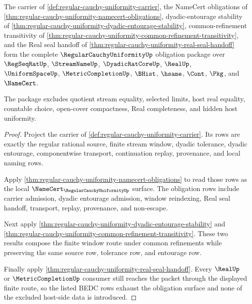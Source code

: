 \begin{theorem}
\label{thm:regular-cauchy-uniformity-scoped-obligation-package}
The carrier of \autoref{def:regular-cauchy-uniformity-carrier}, the NameCert obligations of \autoref{thm:regular-cauchy-uniformity-namecert-obligations}, dyadic-entourage stability of \autoref{thm:regular-cauchy-uniformity-dyadic-entourage-stability}, common-refinement transitivity of \autoref{thm:regular-cauchy-uniformity-common-refinement-transitivity}, and the Real seal handoff of \autoref{thm:regular-cauchy-uniformity-real-seal-handoff} form the complete $\RegularCauchyUniformityUp$ obligation package over $\RegSeqRatUp$, $\StreamNameUp$, $\DyadicRatCoreUp$, $\RealUp$, $\UniformSpaceUp$, $\MetricCompletionUp$, $\BHist$, $\hsame$, $\Cont$, $\Pkg$, and $\NameCert$.

The package excludes quotient stream equality, selected limits, host real equality, countable choice, open-cover compactness, Real completeness, and hidden host uniformity.
\end{theorem}
\begin{proof}
Project the carrier of \autoref{def:regular-cauchy-uniformity-carrier}. Its rows are exactly the regular rational source, finite stream window, dyadic tolerance, dyadic entourage, componentwise transport, continuation replay, provenance, and local naming rows.

Apply \autoref{thm:regular-cauchy-uniformity-namecert-obligations} to read those rows as the local $\NameCert_{\RegularCauchyUniformityUp}$ surface. The obligation rows include carrier admission, dyadic entourage admission, window reindexing, Real seal handoff, transport, replay, provenance, and non-escape.

Next apply \autoref{thm:regular-cauchy-uniformity-dyadic-entourage-stability} and \autoref{thm:regular-cauchy-uniformity-common-refinement-transitivity}. These two results compose the finite window route under common refinements while preserving the same source row, tolerance row, and entourage row.

Finally apply \autoref{thm:regular-cauchy-uniformity-real-seal-handoff}. Every $\RealUp$ or $\MetricCompletionUp$ consumer still reaches the packet through the displayed finite route, so the listed BEDC rows exhaust the obligation surface and none of the excluded host-side data is introduced.
\end{proof}

